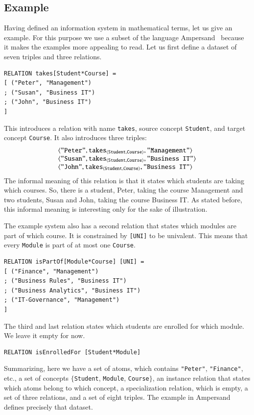 \documentclass{elsarticle}
\begin{document}
\subsection{Example}
\label{As-is IS}
	Having defined an information system in mathematical terms, let us give an example.
	For this purpose we use a subset of the language Ampersand~\cite{Joosten-JLAMP2018}
	because it makes the examples more appealing to read.
	Let us first define a dataset of seven triples and three relations.
\begin{verbatim}
RELATION takes[Student*Course] =
[ ("Peter", "Management")
; ("Susan", "Business IT")
; ("John", "Business IT")
]
\end{verbatim}
	This introduces a relation with name \verb#takes#,
	source concept \verb#Student#, and
	target concept \verb#Course#.
	It also introduces three triples:
\[\begin{array}{l}
	\langle{\text{\tt "Peter"}},{\text{\it \text{\tt takes}\/}_{\langle{\text{\tt Student}},{\text{\tt Course}}\rangle}},{\text{\tt "Management"}}\rangle\\
	\langle{\text{\tt "Susan"}},{\text{\it \text{\tt takes}\/}_{\langle{\text{\tt Student}},{\text{\tt Course}}\rangle}},{\text{\tt "Business IT"}}\rangle\\
	\langle{\text{\tt "John"}},{\text{\it \text{\tt takes}\/}_{\langle{\text{\tt Student}},{\text{\tt Course}}\rangle}},{\text{\tt "Business IT"}}\rangle\\
\end{array}\]
	The informal meaning of this relation is that it states which students are taking which courses.
	So, there is a student, Peter, taking the course Management and two students, Susan and John, taking the course Business IT.
	As stated before, this informal meaning is interesting only for the sake of illustration.

	The example system also has a second relation that states which modules are part of which course.
	It is constrained by \verb-[UNI]- to be univalent.
	This means that every \verb-Module- is part of at most one \verb-Course-.
\begin{verbatim}
RELATION isPartOf[Module*Course] [UNI] =
[ ("Finance", "Management")
; ("Business Rules", "Business IT")
; ("Business Analytics", "Business IT")
; ("IT-Governance", "Management")
]
\end{verbatim}
	The third and last relation states which students are enrolled for which module.
	We leave it empty for now.
\begin{verbatim}
RELATION isEnrolledFor [Student*Module]
\end{verbatim}
	Summarizing, here we have a set of atoms, which contains \verb-"Peter"-, \verb-"Finance"-, etc.,
	a set of concepts $\{$\verb-Student-, \verb-Module-, \verb-Course-$\}$,
	an instance relation that states which atoms belong to which concept,
	a specialization relation, which is empty,
	a set of three relations, and
	a set of eight triples.
	The example in Ampersand defines precisely that dataset.
	
\end{document}

